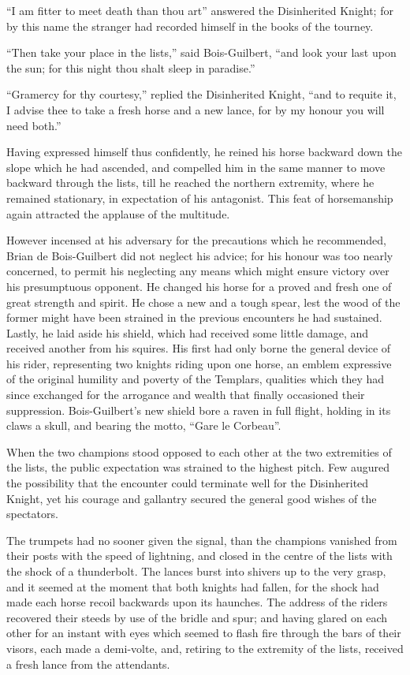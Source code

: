 ``I am fitter to meet death than thou art'' answered the Disinherited
Knight; for by this name the stranger had recorded himself in the books
of the tourney.

``Then take your place in the lists,'' said Bois-Guilbert, ``and look
your last upon the sun; for this night thou shalt sleep in paradise.''

``Gramercy for thy courtesy,'' replied the Disinherited Knight, ``and to
requite it, I advise thee to take a fresh horse and a new lance, for by
my honour you will need both.''

Having expressed himself thus confidently, he reined his horse backward
down the slope which he had ascended, and compelled him in the same
manner to move backward through the lists, till he reached the northern
extremity, where he remained stationary, in expectation of his
antagonist. This feat of horsemanship again attracted the applause of
the multitude.

However incensed at his adversary for the precautions which he
recommended, Brian de Bois-Guilbert did not neglect his advice; for his
honour was too nearly concerned, to permit his neglecting any means
which might ensure victory over his presumptuous opponent. He changed
his horse for a proved and fresh one of great strength and spirit. He
chose a new and a tough spear, lest the wood of the former might have
been strained in the previous encounters he had sustained. Lastly, he
laid aside his shield, which had received some little damage, and
received another from his squires. His first had only borne the general
device of his rider, representing two knights riding upon one horse, an
emblem expressive of the original humility and poverty of the Templars,
qualities which they had since exchanged for the arrogance and wealth
that finally occasioned their suppression. Bois-Guilbert's new shield
bore a raven in full flight, holding in its claws a skull, and bearing
the motto, ``Gare le Corbeau''.

When the two champions stood opposed to each other at the two
extremities of the lists, the public expectation was strained to the
highest pitch. Few augured the possibility that the encounter could
terminate well for the Disinherited Knight, yet his courage and
gallantry secured the general good wishes of the spectators.

The trumpets had no sooner given the signal, than the champions vanished
from their posts with the speed of lightning, and closed in the centre
of the lists with the shock of a thunderbolt. The lances burst into
shivers up to the very grasp, and it seemed at the moment that both
knights had fallen, for the shock had made each horse recoil backwards
upon its haunches. The address of the riders recovered their steeds by
use of the bridle and spur; and having glared on each other for an
instant with eyes which seemed to flash fire through the bars of their
visors, each made a demi-volte, and, retiring to the extremity of the
lists, received a fresh lance from the attendants.

